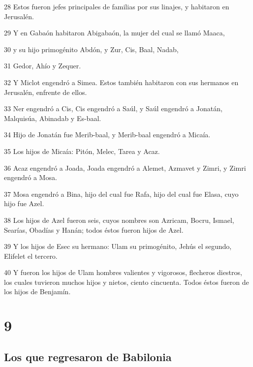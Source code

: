 \par 28 Estos fueron jefes principales de familias por sus linajes, y habitaron en Jerusalén.
\par 29 Y en Gabaón habitaron Abigabaón, la mujer del cual se llamó Maaca,
\par 30 y su hijo primogénito Abdón, y Zur, Cis, Baal, Nadab,
\par 31 Gedor, Ahío y Zequer.
\par 32 Y Miclot engendró a Simea. Estos también habitaron con sus hermanos en Jerusalén, enfrente de ellos.
\par 33 Ner engendró a Cis, Cis engendró a Saúl, y Saúl engendró a Jonatán, Malquisúa, Abinadab y Es-baal.
\par 34 Hijo de Jonatán fue Merib-baal, y Merib-baal engendró a Micaía.
\par 35 Los hijos de Micaía: Pitón, Melec, Tarea y Acaz.
\par 36 Acaz engendró a Joada, Joada engendró a Alemet, Azmavet y Zimri, y Zimri engendró a Mosa.
\par 37 Mosa engendró a Bina, hijo del cual fue Rafa, hijo del cual fue Elasa, cuyo hijo fue Azel.
\par 38 Los hijos de Azel fueron seis, cuyos nombres son Azricam, Bocru, Ismael, Searías, Obadías y Hanán; todos éstos fueron hijos de Azel.
\par 39 Y los hijos de Esec su hermano: Ulam su primogénito, Jehús el segundo, Elifelet el tercero.
\par 40 Y fueron los hijos de Ulam hombres valientes y vigorosos, flecheros diestros, los cuales tuvieron muchos hijos y nietos, ciento cincuenta. Todos éstos fueron de los hijos de Benjamín.

\chapter{9}

\section*{Los que regresaron de Babilonia}

